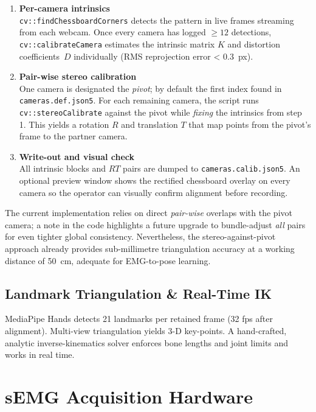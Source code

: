 \begin{enumerate}[label=\arabic*.]
  \item \textbf{Per-camera intrinsics}\\
        \verb|cv::findChessboardCorners| detects the pattern in live frames
        streaming from each webcam.  Once every camera has logged
        $\ge12$ detections, \verb|cv::calibrateCamera| estimates the intrinsic
        matrix $K$ and distortion coefficients~$D$ individually
        (RMS reprojection error < \SI{0.3}{px}).

  \item \textbf{Pair-wise stereo calibration}\\
        One camera is designated the \emph{pivot}; by default the first index
        found in \texttt{cameras.def.json5}.  For each remaining camera, the
        script runs \verb|cv::stereoCalibrate| against the pivot while
        \emph{fixing} the intrinsics from step 1.  
        This yields a rotation $R$ and translation $T$ that map points from the
        pivot’s frame to the partner camera.

  \item \textbf{Write-out and visual check}\\
        All intrinsic blocks and $R\!T$ pairs are dumped to
        \texttt{cameras.calib.json5}.  An optional preview window shows the
        rectified chessboard overlay on every camera so the operator can
        visually confirm alignment before recording.
\end{enumerate}

\noindent
The current implementation relies on direct \emph{pair-wise} overlaps with the
pivot camera; a note in the code highlights a future upgrade to bundle-adjust
\emph{all} pairs for even tighter global consistency.  Nevertheless, the
stereo-against-pivot approach already provides sub-millimetre triangulation
accuracy at a working distance of \SI{50}{\centi\metre}, adequate for EMG-to-pose
learning.

\subsection{Landmark Triangulation \& Real-Time IK}
MediaPipe Hands detects 21 landmarks per retained frame (32 fps after
alignment). Multi-view triangulation yields 3-D key-points. A hand-crafted,
analytic inverse-kinematics solver enforces bone lengths and joint limits and works in real time.

\section{sEMG Acquisition Hardware}


